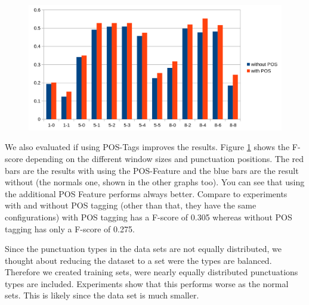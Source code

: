 \begin{figure}[ht]
    \centering
    \includegraphics[width=\textwidth]{img/window_pos_eval.png}
    \caption{}
    \label{fig:window_pos_eval}
\end{figure}

We also evaluated if using POS-Tags improves the results. Figure \ref{fig:window_pos_eval} shows the F-score depending on the different window sizes and punctuation positions. The red bars are the results with using the POS-Feature and the blue bars are the result without (the normals one, shown in the other graphs too).
You can see that using the additional POS Feature performs always better.
Compare to experiments with and without POS tagging (other than that, they have the same configurations) with POS tagging has a F-score of 0.305 whereas without POS tagging has only a F-score of 0.275.

Since the punctuation types in the data sets are not equally distributed, we thought about reducing the dataset to a set were the types are balanced. Therefore we created training sets, were nearly equally distributed punctuations types are included. Experiments show that this performs worse as the normal sets. This is likely since the data set is much smaller.

